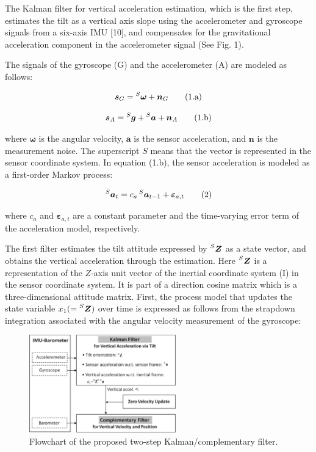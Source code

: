 \documentclass[10pt,journal,compsoc]{IEEEtran}
\begin{document}
The Kalman filter for vertical acceleration estimation, which is the first
step, estimates the tilt as a vertical axis slope using the accelerometer and
gyroscope signals from a six-axis IMU [10], and compensates for the
gravitational acceleration component in the accelerometer signal (See Fig. 1).

The signals of the gyroscope (G) and the accelerometer (A) are modeled as
follows:

\[\bm{s}_G = \prescript{S}{}{\bm{\omega}}+\bm{n}_G\tag{1.a}\]

\[\bm{s}_A = \prescript{S}{}{\bm{g}}+\prescript{S}{}{\bm{a}}+\bm{n}_A\tag{1.b}\]


\noindent where $\bm{\omega}$ is the angular velocity, $\bm{a}$ is the sensor
acceleration, and $\bm{n}$ is the measurement noise. The superscript $S$ 
means that the vector is represented in the sensor coordinate system. In
equation (1.b), the sensor acceleration is modeled as a first-order Markov
process:

\[\prescript{S}{}{\bm{a}_t} = c_a\prescript{S}{}{\bm{a}_{t-1}}+\bm{\varepsilon}_{a,t}\tag{2}\]

\noindent where $c_a$ and $\bm{\varepsilon}_{a,t}$ are a constant parameter and
the time-varying error term of the acceleration model, respectively.

The first filter estimates the tilt attitude expressed by
$\prescript{S}{}{\bm{Z}}$ as a state vector, and obtains the vertical
acceleration through the estimation. Here $\prescript{S}{}{\bm{Z}}$ is a
representation of the $Z$-axis unit vector of the inertial coordinate system (I) in
the sensor coordinate system.  It is part of a direction cosine matrix which is
a three-dimensional attitude matrix. First, the process model that updates the
state variable $x_1 (= \prescript{S}{}{\bm{Z}})$ over time is expressed as
follows from the strapdown integration associated with the angular velocity
measurement of the gyroscope:

\begin{figure}[!t]
\centering
\includegraphics[width=2.5in]{fig1}
    \caption{Flowchart of the proposed two-step Kalman/complementary filter.}
\label{fig1}
\end{figure}
\end{document}
